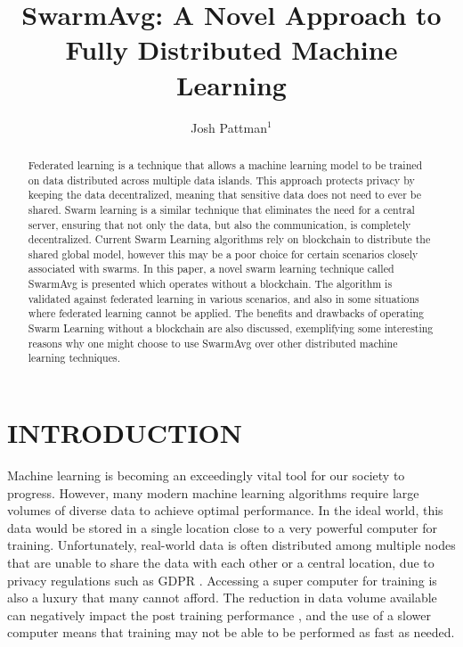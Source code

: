 \documentclass[letterpaper, 10 pt, conference]{ieeeconf}  %
\title{\LARGE \bf SwarmAvg: A Novel Approach to Fully Distributed Machine Learning}
\author{Josh Pattman$^{1}$%
}
\begin{document}
\maketitle
\thispagestyle{empty}
\pagestyle{empty}


\begin{abstract}

Federated learning is a technique that allows a machine learning model to be trained on data distributed across multiple data islands. This approach protects privacy by keeping the data decentralized, meaning that sensitive data does not need to ever be shared. Swarm learning is a similar technique that eliminates the need for a central server, ensuring that not only the data, but also the communication, is completely decentralized. Current Swarm Learning algorithms rely on blockchain to distribute the shared global model, however this may be a poor choice for certain scenarios closely associated with swarms. In this paper, a novel swarm learning technique called SwarmAvg is presented which operates without a blockchain. The algorithm is validated against federated learning in various scenarios, and also in some situations where federated learning cannot be applied. The benefits and drawbacks of operating Swarm Learning without a blockchain are also discussed, exemplifying some interesting reasons why one might choose to use SwarmAvg over other distributed machine learning techniques.

\end{abstract}


\section{INTRODUCTION}

Machine learning is becoming an exceedingly vital tool for our society to progress. However, many modern machine learning algorithms require large volumes of diverse data to achieve optimal performance. In the ideal world, this data would be stored in a single location close to a very powerful computer for training. Unfortunately, real-world data is often distributed among multiple nodes that are unable to share the data with each other or a central location, due to privacy regulations such as GDPR \cite{gdpr}. Accessing a super computer for training is also a luxury that many cannot afford. The reduction in data volume available can negatively impact the post training performance \cite{data_volume}, and the use of a slower computer means that training may not be able to be performed as fast as needed.
\end{document}
